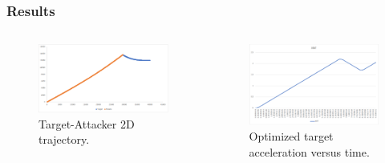 \documentclass{beamer}
\begin{document}
\begin{frame}
\frametitle{Results}
\begin{columns}[c]
	\begin{column}{.3\linewidth}
		 \begin{figure}[H]
			\centering
			\includegraphics[scale = 0.23]{fig/trajectory.PNG}
			\caption{Target-Attacker 2D trajectory.}
			\label{trajectory}
		\end{figure}
	\end{column}

	\begin{column}{.3\linewidth}
		\begin{figure}[H]
			\centering
			\includegraphics[scale = 0.23]{fig/XNT.PNG}
			\caption{Optimized target acceleration versus time.}
			\label{XNT}
		\end{figure}
	\end{column}


\end{columns}
\end{frame}
\end{document}
